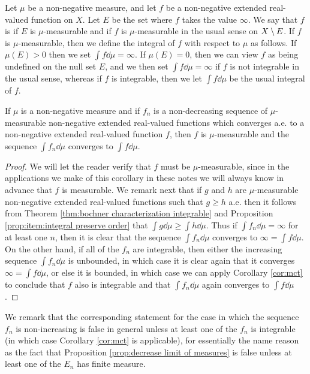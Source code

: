 \begin{definition}
\label{def:extended real meas integrable}
Let $\mu$ be a non-negative measure, and let $f$ be a non-negative extended real-valued function on $X$. Let $E$ be the set where $f$ takes the value $\infty$. We say that $f$ is  if $E$ is $\mu$-measurable and if $f$ is $\mu$-measurable in the usual sense on $X\setminus E$. If $f$ is $\mu$-measurable, then we define the integral of $f$ with respect to $\mu$ as follows. If $\mu(E)>0$ then we set $\int f\dd\mu=\infty$. If $\mu(E)=0$, then we can view $f$ as being undefined on the null set $E$, and we then set $\int f\dd\mu=\infty$ if $f$ is not integrable in the usual sense, whereas if $f$ is integrable, then we let $\int f\dd\mu$ be the usual integral of $f$.
\end{definition}

\begin{corollary}
\label{cor:mct extended real}
If $\mu$ is a non-negative measure and if $f_n$ is a non-decreasing sequence of $\mu$-measurable non-negative extended real-valued functions which converges a.e. to a non-negative extended real-valued function $f$, then $f$ is $\mu$-measurable and the sequence $\int f_n\dd\mu$ converges to $\int f\dd\mu$.
\end{corollary}

\begin{proof}
We will let the reader verify that $f$ must be $\mu$-measurable, since in the applications we make of this corollary in these notes we will always know in advance that $f$ is measurable. We remark next that if $g$ and $h$ are $\mu$-measurable non-negative extended real-valued functions such that $g\geq h$ a.e. then it follows from Theorem \ref{thm:bochner characterization integrable} and Proposition \ref{prop:item:integral preserve order} that $\int g\dd\mu\geq\int h\dd\mu$. Thus if $\int f_n\dd\mu=\infty$ for at least one $n$, then it is clear that the sequence $\int f_n\dd\mu$ converges to $\infty=\int f\dd\mu$. On the other hand, if all of the $f_n$ are integrable, then either the increasing sequence $\int f_n\dd\mu$ is unbounded, in which case it is clear again that it converges $\infty=\int f\dd\mu$, or else it is bounded, in which case we can apply Corollary \ref{cor:mct} to conclude that $f$ also is integrable and that $\int f_n\dd\mu$ again converges to $\int f\dd\mu$.
\end{proof}

We remark that the corresponding statement for the case in which the sequence $f_n$ is non-increasing is false in general unless at least one of the $f_n$ is integrable (in which case Corollary \ref{cor:mct} is applicable), for essentially the name reason as the fact that Proposition \ref{prop:decrease limit of measures} is false unless at least one of the $E_n$ has finite measure.

